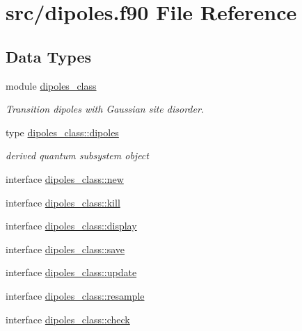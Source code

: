 \hypertarget{dipoles_8f90}{\section{src/dipoles.f90 File Reference}
\label{dipoles_8f90}
}
\subsection*{Data Types}
\begin{DoxyCompactItemize}
\item 
module \hyperlink{classdipoles__class}{dipoles\-\_\-class}
\begin{DoxyCompactList}\small\item\em Transition dipoles with Gaussian site disorder. \end{DoxyCompactList}\item 
type \hyperlink{structdipoles__class_1_1dipoles}{dipoles\-\_\-class\-::dipoles}
\begin{DoxyCompactList}\small\item\em derived quantum subsystem object \end{DoxyCompactList}\item 
interface \hyperlink{interfacedipoles__class_1_1new}{dipoles\-\_\-class\-::new}
\item 
interface \hyperlink{interfacedipoles__class_1_1kill}{dipoles\-\_\-class\-::kill}
\item 
interface \hyperlink{interfacedipoles__class_1_1display}{dipoles\-\_\-class\-::display}
\item 
interface \hyperlink{interfacedipoles__class_1_1save}{dipoles\-\_\-class\-::save}
\item 
interface \hyperlink{interfacedipoles__class_1_1update}{dipoles\-\_\-class\-::update}
\item 
interface \hyperlink{interfacedipoles__class_1_1resample}{dipoles\-\_\-class\-::resample}
\item 
interface \hyperlink{interfacedipoles__class_1_1check}{dipoles\-\_\-class\-::check}
\end{DoxyCompactItemize}
